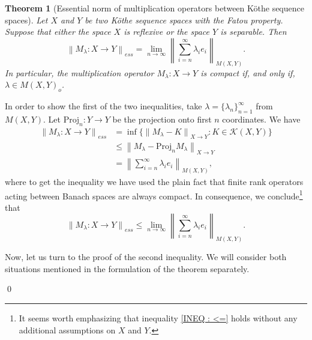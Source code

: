 \documentclass[11pt]{amsart}
\theoremstyle{definition}
\newtheorem{theorem}{Theorem}[section]
\theoremstyle{definition}
\theoremstyle{definition}
\theoremstyle{definition}
\theoremstyle{definition}
\theoremstyle{definition}
\theoremstyle{definition}
\theoremstyle{definition}
\numberwithin{equation}{section}
\numberwithin{equation}{section}
\numberwithin{equation}{section}
\theoremstyle{definition}
\theoremstyle{definition}
\theoremstyle{definition}
\theoremstyle{definition}
\theoremstyle{definition}
\theoremstyle{definition}
\newcommand{\norm}[1]{\left\lVert#1\right\rVert}
\renewenvironment{proof}{\noindent {\bf Proof.}}{\qed}
\begin{document}
\begin{theorem}[Essential norm of multiplication operators between K{\" o}the sequence spaces] \label{THM: Essential norm Kothe sequence}
	{\it Let $X$ and $Y$ be two K{\" o}the sequence spaces with the Fatou property. Suppose that either the space $X$ is reflexive
		or the space $Y$ is separable. Then
	\begin{equation*}
		\norm{M_{\lambda} \colon X \rightarrow Y}_{ess} = \lim\limits_{n \rightarrow \infty} \norm{ \sum_{i=n}^{\infty} \lambda_i e_i }_{M(X,Y)}.
	\end{equation*}
		In particular, the multiplication operator $M_{\lambda} \colon X \rightarrow Y$ is compact if, and only if, $\lambda \in M(X,Y)_o$.}
\end{theorem}
\begin{proof}
	In order to show the first of the two inequalities, take $\lambda = \{\lambda_n\}_{n=1}^\infty$ from $M(X,Y)$.
	Let $\text{Proj}_n \colon Y \rightarrow Y$ be the projection onto first $n$ coordinates. We have
	\begin{align*}
		\norm{M_{\lambda} \colon X \rightarrow Y}_{ess}
				& = \inf \Big\{ \norm{M_{\lambda} - K}_{X \rightarrow Y} \colon K \in {\mathscr K}(X,Y) \Big\} \\
				& \leqslant \norm{M_{\lambda} - \text{Proj}_n M_{\lambda}}_{X \rightarrow Y} \\
				& = \norm{ \sum_{i=n}^{\infty} \lambda_i e_i }_{M(X,Y)},
	\end{align*}
	where to get the inequality we have used the plain fact that finite rank operators acting between Banach spaces are always compact.
	In consequence, we conclude\footnote{It seems worth emphasizing that inequality \eqref{INEQ : <=} holds without any additional assumptions on $X$ and $Y$.}
	that
	\begin{equation} \label{INEQ : <=}
		\norm{M_{\lambda} \colon X \rightarrow Y}_{ess} \leqslant \lim_{n \rightarrow \infty} \norm{ \sum_{i=n}^{\infty} \lambda_i e_i }_{M(X,Y)}.
	\end{equation}
	
	Now, let us turn to the proof of the second inequality. We will consider both situations mentioned in the formulation of the theorem separately.
	

\end{proof}
\end{document}
